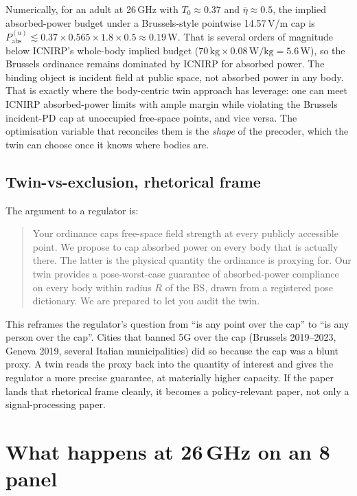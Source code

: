 \documentclass[11pt,a4paper]{article}
\theoremstyle{definition}
\newcommand{\Pabs}{P_{\mathrm{abs}}}
\begin{document}
Numerically, for an adult at 26\,GHz with $T_0\approx 0.37$ and
$\bar\eta\approx 0.5$, the implied absorbed-power budget under a
Brussels-style pointwise 14.57\,V/m cap is
$\Pabs^{(u)}\lesssim 0.37\times 0.565 \times 1.8 \times 0.5
\approx 0.19$\,W. That is several orders of magnitude below ICNIRP's
whole-body implied budget ($70\,\mathrm{kg}\times 0.08\,\mathrm{W/kg}=5.6$\,W),
so the Brussels ordinance remains dominated by ICNIRP for absorbed
power. The binding object is incident field at public space, not
absorbed power in any body. That is exactly where the
body-centric twin approach has leverage: one can meet ICNIRP
absorbed-power limits with ample margin while violating the
Brussels incident-PD cap at unoccupied free-space points, and vice
versa. The optimisation variable that reconciles them is the
\emph{shape} of the precoder, which the twin can choose once it
knows where bodies are.

\subsection{Twin-vs-exclusion, rhetorical frame}

The argument to a regulator is:

\begin{quote}
Your ordinance caps free-space field strength at every publicly
accessible point. We propose to cap absorbed power on every body
that is actually there. The latter is the physical quantity the
ordinance is proxying for. Our twin provides a pose-worst-case
guarantee of absorbed-power compliance on every body within radius
$R$ of the BS, drawn from a registered pose dictionary. We are
prepared to let you audit the twin.
\end{quote}

This reframes the regulator's question from ``is any point over the
cap'' to ``is any person over the cap''. Cities that banned 5G over
the cap (Brussels 2019--2023, Geneva 2019, several Italian
municipalities) did so because the cap was a blunt proxy. A twin
reads the proxy back into the quantity of interest and gives the
regulator a more precise guarantee, at materially higher capacity.
If the paper lands that rhetorical frame cleanly, it becomes a
policy-relevant paper, not only a signal-processing paper.

\section{What happens at 26\,GHz on an 8 panel}\label{sec:numbers}
\end{document}
